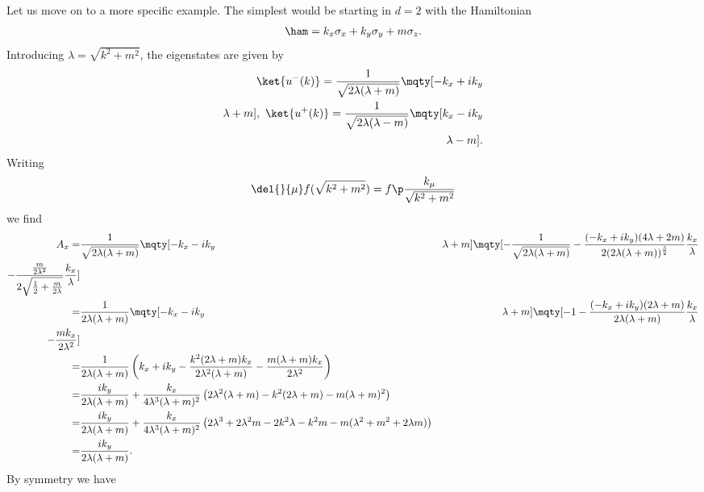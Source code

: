 Let us move on to a more specific example. The simplest would be starting in $d = 2$ with the Hamiltonian
\begin{align*}
	\ham = k_{x}\sigma_{x} + k_{y}\sigma_{y} + m\sigma_{z}.
\end{align*}
Introducing $\lambda = \sqrt{k^{2} + m^{2}}$, the eigenstates are given by
\begin{align*}
	\ket{u^{-}(k)} = \frac{1}{\sqrt{2\lambda(\lambda + m)}}\mqty[
		-k_{x} + ik_{y} \\
		\lambda + m
	],\ \ket{u^{+}(k)} = \frac{1}{\sqrt{2\lambda(\lambda - m)}}\mqty[
		k_{x} - ik_{y} \\
		\lambda - m
	].
\end{align*}
Writing
\begin{align*}
	\del{}{\mu}f(\sqrt{k^{2} + m^{2}}) = f\p\frac{k_{\mu}}{\sqrt{k^{2} + m^{2}}}
\end{align*}
we find
\begin{align*}
	A_{x} =& \frac{1}{\sqrt{2\lambda(\lambda + m)}}\mqty[
	-k_{x} - ik_{y} & \lambda + m
	]\mqty[
		-\frac{1}{\sqrt{2\lambda(\lambda + m)}} - \frac{(-k_{x} + ik_{y})(4\lambda + 2m)}{2(2\lambda(\lambda + m))^{\frac{3}{2}}}\frac{k_{x}}{\lambda} \\
		-\frac{\frac{m}{2\lambda^{2}}}{2\sqrt{\frac{1}{2} + \frac{m}{2\lambda}}}\frac{k_{x}}{\lambda}
	] \\
	=& \frac{1}{2\lambda(\lambda + m)}\mqty[
	-k_{x} - ik_{y} & \lambda + m
	]\mqty[
	-1 - \frac{(-k_{x} + ik_{y})(2\lambda + m)}{2\lambda(\lambda + m)}\frac{k_{x}}{\lambda} \\
	-\frac{mk_{x}}{2\lambda^{2}}
	] \\
	=& \frac{1}{2\lambda(\lambda + m)}\left(k_{x} + ik_{y} - \frac{k^{2}(2\lambda + m)k_{x}}{2\lambda^{2}(\lambda + m)} - \frac{m(\lambda + m)k_{x}}{2\lambda^{2}}\right) \\
	=& \frac{ik_{y}}{2\lambda(\lambda + m)} + \frac{k_{x}}{4\lambda^{3}(\lambda + m)^{2}}\left(2\lambda^{2}(\lambda + m) - k^{2}(2\lambda + m) - m(\lambda + m)^{2}\right) \\
	=& \frac{ik_{y}}{2\lambda(\lambda + m)} + \frac{k_{x}}{4\lambda^{3}(\lambda + m)^{2}}\left(2\lambda^{3} + 2\lambda^{2}m - 2k^{2}\lambda - k^{2}m - m(\lambda^{2} + m^{2} + 2\lambda m)\right) \\
	=& \frac{ik_{y}}{2\lambda(\lambda + m)}.
\end{align*}
By symmetry we have
